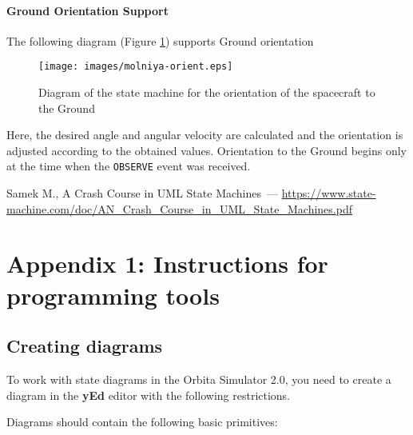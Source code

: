 \documentclass[12pt,a4paper]{article}
\begin{document}
\clearpage
\paragraph{Ground Orientation Support} The following diagram (Figure \ref{Pic:Molniya-orient-en}) supports Ground orientation

\begin{figure}[tbh]
  \begin{center}
    \texttt{[image: images/molniya-orient.eps]}
    \caption{Diagram of the state machine for the orientation of the spacecraft to the Ground}
    \label{Pic:Molniya-orient-en}
  \end{center}
\end{figure}

Here, the desired angle and angular velocity are calculated and the orientation is adjusted according to the obtained values.
Orientation to the Ground begins only at the time when the \verb'OBSERVE' event was received.

\begin{thebibliography}{2}
 Samek M., A Crash Course in UML State Machines~---
  \url{https://www.state-machine.com/doc/AN_Crash_Course_in_UML_State_Machines.pdf}
\end{thebibliography}

\clearpage
\section*{Appendix 1: Instructions for programming tools}

\subsection*{Creating diagrams}

To work with state diagrams in the Orbita Simulator 2.0, you need to create a diagram in the \textbf{yEd} editor with the following restrictions.

Diagrams should contain the following basic primitives:
\end{document}
